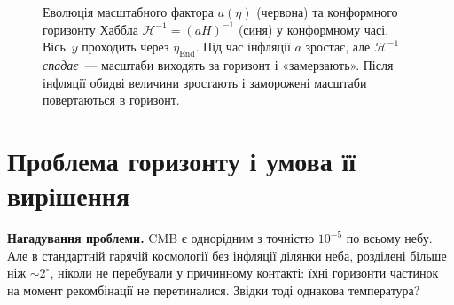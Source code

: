 \begin{figure}[h!]
\caption{Еволюція масштабного фактора $a(\eta)$ (червона)
    та конформного горизонту Хаббла $\mathcal{H}^{-1} = (aH)^{-1}$
    (синя) у конформному часі. Вісь~$y$ проходить через
    $\eta_{\text{End}}$. Під час інфляції $a$ зростає,
    але $\mathcal{H}^{-1}$ \emph{спадає}~--- масштаби виходять
    за горизонт і «замерзають». Після інфляції обидві величини
    зростають і заморожені масштаби повертаються в горизонт.}
\label{fig:conformal_inflation}
\end{figure}

\section{Проблема горизонту і умова її вирішення}
\label{sec:horizon_problem}

\textbf{Нагадування проблеми.}
CMB є однорідним з точністю $10^{-5}$ по всьому небу.
Але в стандартній гарячій космології без інфляції ділянки неба,
розділені більше ніж $\sim 2^\circ$, ніколи не перебували
у причинному контакті: їхні горизонти частинок на момент
рекомбінації не перетиналися. Звідки тоді однакова температура?

